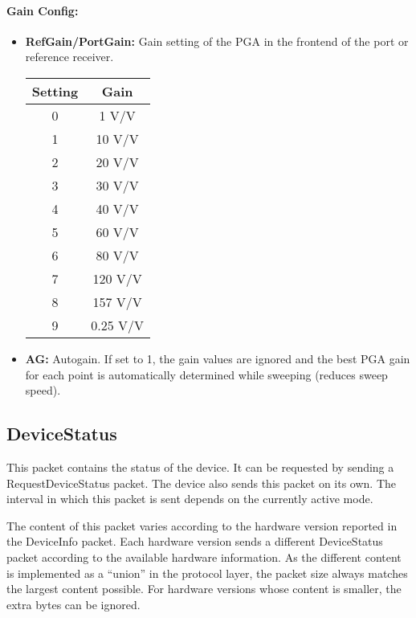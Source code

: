 \documentclass[a4paper,11pt]{article}
\newcommand{\bitrect}[2]{
  \begin{pgfonlayer}{foreground}
    \draw [thick] (0,0) rectangle (#1,1);
    \pgfmathsetmacro\result{#1-1}
    \foreach \x in {1,...,\result}
      \draw [thick] (\x,1) -- (\x, 0.8);
  \end{pgfonlayer}
  \bitlabels{#1}{#2}
}
\newcommand{\rwbits}[3]{
  \draw [thick] (#1,0) rectangle ++(#2,1) node[pos=0.5]{#3};
  \pgfmathsetmacro\start{#1+0.5}
  \pgfmathsetmacro\finish{#1+#2-0.5}
}
\newcommand{\robits}[3]{
  \begin{pgfonlayer}{background}
    \draw [thick, fill=lightgray] (#1,0) rectangle ++(#2,1) node[pos=0.5]{#3};
  \end{pgfonlayer}
  \pgfmathsetmacro\start{#1+0.5}
  \pgfmathsetmacro\finish{#1+#2-0.5}
}
\newcommand{\bitlabels}[2]{
  \foreach \bit in {1,...,#1}{
     \pgfmathsetmacro\result{#2}
     \node [above] at (\bit-0.5, 1) {\pgfmathprintnumber{\result}};
   }
}
\begin{document}
\paragraph{Gain Config:}
\begin{center}
\end{center}
\begin{itemize}
\item \textbf{RefGain/PortGain:} Gain setting of the PGA in the frontend of the port or reference receiver.
\begin{center}
\begin{tabular}{ c|c }
Setting & Gain\\
 \hline
0 & 1 V/V \\
1 & 10 V/V\\
2 & 20 V/V\\
3 & 30 V/V\\
4 & 40 V/V\\
5 & 60 V/V\\
6 & 80 V/V\\
7 & 120 V/V\\
8 & 157 V/V\\
9 & 0.25 V/V\\
\end{tabular}
\end{center}
\item \textbf{AG:} Autogain. If set to 1, the gain values are ignored and the best PGA gain for each point is automatically determined while sweeping (reduces sweep speed).
\end{itemize}

\subsection{DeviceStatus}
This packet contains the status of the device. It can be requested by sending a RequestDeviceStatus packet. The device also sends this packet on its own. The interval in which this packet is sent depends on the currently active mode.

The content of this packet varies according to the hardware version reported in the DeviceInfo packet. Each hardware version sends a different DeviceStatus packet according to the available hardware information. As the different content is implemented as a ``union'' in the protocol layer, the packet size always matches the largest content possible. For hardware versions whose content is smaller, the extra bytes can be ignored.
\end{document}
